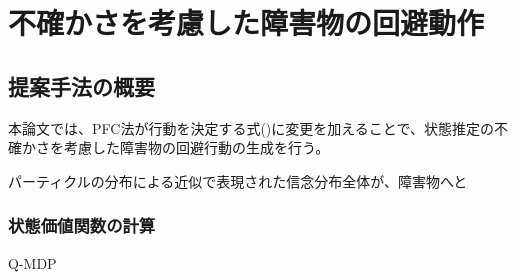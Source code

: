 \chapter{不確かさを考慮した障害物の回避動作}


\section{提案手法の概要}

本論文では、PFC法が行動を決定する式()に変更を加えることで、状態推定の不確かさを考慮した障害物の回避行動の生成を行う。

パーティクルの分布による近似で表現された信念分布全体が、障害物へと


\subsection{状態価値関数の計算}

Q-MDP

\subsection{}
